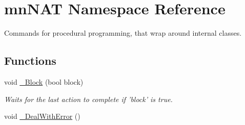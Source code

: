 \hypertarget{namespacemn_n_a_t}{
\section{mnNAT Namespace Reference}
\label{namespacemn_n_a_t}
}


Commands for procedural programming, that wrap around internal classes.  


\subsection*{Functions}
\begin{DoxyCompactItemize}
\item 
void \hyperlink{namespacemn_n_a_t_a6ea1e6643d17c0c9a5179376a51c023c}{\_\-Block} (bool block)
\begin{DoxyCompactList}\small\item\em Waits for the last action to complete if 'block' is true. \item\end{DoxyCompactList}\item 
\hypertarget{namespacemn_n_a_t_af20ffeb7905e67d45c4cad2a5ba188e4}{
void \hyperlink{namespacemn_n_a_t_af20ffeb7905e67d45c4cad2a5ba188e4}{\_\-DealWithError} ()}
\label{namespacemn_n_a_t_af20ffeb7905e67d45c4cad2a5ba188e4}


\end{DoxyCompactItemize}
